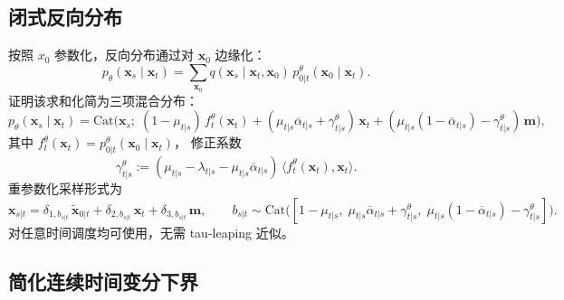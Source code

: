 \documentclass[12pt,a4paper]{ctexbook}
\theoremstyle{definition}
\begin{document}
\subsection{闭式反向分布}

按照 $x_0$ 参数化，反向分布通过对 $\boldsymbol{x}_0$ 边缘化：
\begin{equation}
p_\theta(\boldsymbol{x}_s \mid \boldsymbol{x}_t) = \sum_{\boldsymbol{x}_0} q(\boldsymbol{x}_s \mid \boldsymbol{x}_t, \boldsymbol{x}_0) \, p_{0|t}^\theta(\boldsymbol{x}_0 \mid \boldsymbol{x}_t). \label{eq:p-reverse-sum}
\end{equation}
\cite[§2.2 Proposition 2.2]{zhao2025ud3} 证明该求和化简为三项混合分布：
\begin{equation}
p_\theta(\boldsymbol{x}_s \mid \boldsymbol{x}_t) = \text{Cat}\Big(\boldsymbol{x}_s; \;
(1 - \mu_{t|s}) \, f_t^\theta(\boldsymbol{x}_t) + (\mu_{t|s}\overline{\alpha}_{t|s} + \gamma_{t|s}^\theta) \, \boldsymbol{x}_t + (\mu_{t|s}(1 - \overline{\alpha}_{t|s}) - \gamma_{t|s}^\theta) \, \mathbf{m} \Big), \label{eq:p-reverse-closed}
\end{equation}
其中 $f_t^\theta(\boldsymbol{x}_t) = p_{0|t}^\theta(\boldsymbol{x}_0 \mid \boldsymbol{x}_t)$，
修正系数
\begin{equation}
\gamma_{t|s}^\theta := (\mu_{t|s} - \lambda_{t|s} - \mu_{t|s}\overline{\alpha}_{t|s}) \, \langle f_t^\theta(\boldsymbol{x}_t), \boldsymbol{x}_t \rangle. \label{eq:gamma}
\end{equation}
重参数化采样形式为
\begin{equation}
\boldsymbol{x}_{s|t} = \delta_{1, b_{s|t}} \, \tilde{\boldsymbol{x}}_{0|t} + \delta_{2, b_{s|t}} \, \boldsymbol{x}_t + \delta_{3, b_{s|t}} \, \mathbf{m},
\qquad
b_{s|t} \sim \text{Cat}\big([1 - \mu_{t|s}, \; \mu_{t|s}\overline{\alpha}_{t|s} + \gamma_{t|s}^\theta, \; \mu_{t|s}(1 - \overline{\alpha}_{t|s}) - \gamma_{t|s}^\theta]\big). \label{eq:reparam-sample}
\end{equation}
对任意时间调度均可使用，无需 tau-leaping 近似。

\subsection{简化连续时间变分下界}
\end{document}
